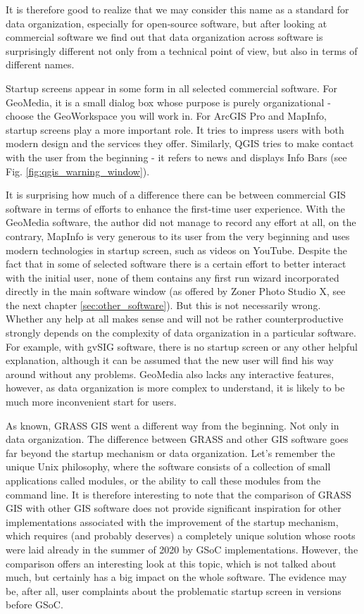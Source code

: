 \documentclass[a4paper,10pt,twoside]{article}
\begin{document}
\noindent It is therefore good to realize that we may consider this name as a standard for data organization, especially for open-source software, but after looking at commercial software we find out that data organization across software is surprisingly different not only from a technical point of view, but also in terms of different names.

Startup screens appear in some form in all selected commercial software. For GeoMedia, it is a small dialog box whose purpose is purely organizational - choose the GeoWorkspace you will work in. For ArcGIS Pro and MapInfo, startup screens play a more important role. It tries to impress users with both modern design and the services they offer. Similarly, QGIS tries to make contact with the user from the beginning - it refers to news and displays Info Bars (see Fig. \ref{fig:qgis_warning_window}).

It is surprising how much of a difference there can be between commercial GIS software in terms of efforts to enhance the first-time user experience. With the GeoMedia software, the author did not manage to record any effort at all, on the contrary, MapInfo is very generous to its user from the very beginning and uses modern technologies in startup screen, such as videos on YouTube. Despite the fact that in some of selected software there is a certain effort to better interact with the initial user, none of them contains any first run wizard incorporated directly in the main software window (as offered by Zoner Photo Studio X, see the next chapter \ref{sec:other_software}). But this is not necessarily wrong. Whether any help at all makes sense and will not be rather counterproductive strongly depends on the complexity of data organization in a particular software. For example, with gvSIG software, there is no startup screen or any other helpful explanation, although it can be assumed that the new user will find his way around without any problems. GeoMedia also lacks any interactive features, however, as data organization is more complex to understand, it is likely to be much more inconvenient start for users.

As known, GRASS GIS went a different way from the beginning. Not only in data organization. The difference between GRASS and other GIS software goes far beyond the startup mechanism or data organization. Let's remember the unique Unix philosophy, where the software consists of a collection of small applications called modules, or the ability to call these modules from the command line. It is therefore interesting to note that the comparison of GRASS GIS with other GIS software does not provide significant inspiration for other implementations associated with the improvement of the startup mechanism, which requires (and probably deserves) a completely unique solution whose roots were laid already in the summer of 2020 by GSoC implementations. However, the comparison offers an interesting look at this topic, which is not talked about much, but certainly has a big impact on the whole software. The evidence may be, after all,  user complaints about the problematic startup screen in versions before GSoC.
\end{document}
